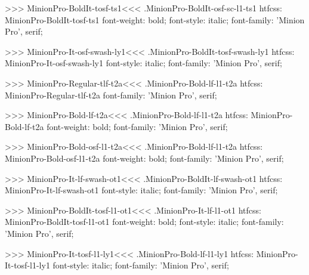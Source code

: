 {>>>
\<MinionPro-BoldIt-tosf-ts1\><<<
.MinionPro-BoldIt-osf-sc-l1-ts1
htfcss:  MinionPro-BoldIt-tosf-ts1  font-weight: bold; font-style: italic; font-family: 'Minion Pro', serif;

>>>
\<MinionPro-It-osf-swash-ly1\><<<
.MinionPro-BoldIt-tosf-swash-ly1
htfcss:  MinionPro-It-osf-swash-ly1  font-style: italic; font-family: 'Minion Pro', serif;

>>>
\<MinionPro-Regular-tlf-t2a\><<<
.MinionPro-Bold-lf-l1-t2a
htfcss:  MinionPro-Regular-tlf-t2a  font-family: 'Minion Pro', serif;

>>>
\<MinionPro-Bold-lf-t2a\><<<
.MinionPro-Bold-lf-l1-t2a
htfcss:  MinionPro-Bold-lf-t2a  font-weight: bold; font-family: 'Minion Pro', serif;

>>>
\<MinionPro-Bold-osf-l1-t2a\><<<
.MinionPro-Bold-lf-l1-t2a
htfcss:  MinionPro-Bold-osf-l1-t2a  font-weight: bold; font-family: 'Minion Pro', serif;

>>>
\<MinionPro-It-lf-swash-ot1\><<<
.MinionPro-BoldIt-lf-swash-ot1
htfcss:  MinionPro-It-lf-swash-ot1  font-style: italic; font-family: 'Minion Pro', serif;

>>>
\<MinionPro-BoldIt-tosf-l1-ot1\><<<
.MinionPro-It-lf-l1-ot1
htfcss:  MinionPro-BoldIt-tosf-l1-ot1  font-weight: bold; font-style: italic; font-family: 'Minion Pro', serif;

>>>
\<MinionPro-It-tosf-l1-ly1\><<<
.MinionPro-Bold-lf-l1-ly1
htfcss:  MinionPro-It-tosf-l1-ly1  font-style: italic; font-family: 'Minion Pro', serif;

}
